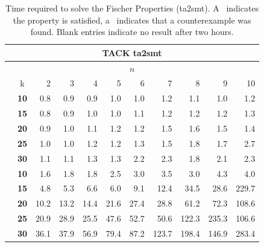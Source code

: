 \documentclass[a4paper,11pt]{report}
\newcommand*\cmark{\small\Checkmark}
\newcommand*{\xmark}{\small\XSolidBrush}
\theoremstyle{definition}
\begin{document}
\begin{table}
\begin{tabular}{c|c|r r r r r r r r r}
\end{tabular}
\end{table}



\begin{table}
\footnotesize
{}
\centering
\caption[Time required to solve the Fischer Properties (ta2smt)]{Time required to solve the Fischer Properties (ta2smt). A \cmark\
  indicates the property is satisfied, a \xmark\ indicates that a counterexample
  was found. Blank entries indicate no result after two hours.}
\label{table:fischer-results-ta2smt}
\begin{tabular}{c|c|r r r r r r r r r}
\midrule
\multicolumn{11}{c}{TACK ta2smt} \\
\midrule
\multicolumn{11}{c}{\(n\)} \\
\midrule
& k & 2 & 3 & 4 & 5 & 6 & 7 & 8 & 9 & 10 \\
\midrule
\multirow{5}{1em}{\rotatebox{90}{\textbf{live-one}}}
 & \textbf{10} & 0.8\cmark & 0.9\cmark & 0.9\cmark & 1.0\cmark & 1.0\cmark & 1.2\cmark & 1.1\cmark & 1.0\cmark & 1.2\cmark \\
 & \textbf{15} & 0.8\cmark & 0.9\cmark & 1.0\cmark & 1.0\cmark & 1.1\cmark & 1.2\cmark & 1.2\cmark & 1.2\cmark & 1.3\cmark \\
 & \textbf{20} & 0.9\cmark & 1.0\cmark & 1.1\cmark & 1.2\cmark & 1.2\cmark & 1.5\cmark & 1.6\cmark & 1.5\cmark & 1.4\cmark \\
 & \textbf{25} & 1.0\cmark & 1.0\cmark & 1.2\cmark & 1.2\cmark & 1.3\cmark & 1.5\cmark & 1.8\cmark & 1.7\cmark & 2.7\cmark \\
 & \textbf{30} & 1.1\cmark & 1.1\cmark & 1.3\cmark & 1.3\cmark & 2.2\cmark & 2.3\cmark & 1.8\cmark & 2.1\cmark & 2.3\cmark \\
  \midrule
\multirow{5}{1em}{\rotatebox{90}{\textbf{live-two}}}
  & \textbf{10} & 1.6\cmark & 1.8\cmark & 1.8\cmark & 2.5\cmark & 3.0\cmark & 3.5\cmark & 3.0\cmark & 4.3\cmark & 4.0\cmark \\
  & \textbf{15} & 4.8\cmark & 5.3\cmark & 6.6\cmark & 6.0\cmark & 9.1\cmark & 12.4\cmark & 34.5\cmark & 28.6\cmark & 229.7\cmark \\
  & \textbf{20} & 10.2\cmark & 13.2\cmark & 14.4\cmark & 21.6\cmark & 27.4\cmark & 28.8\cmark & 61.2\cmark & 72.3\cmark & 108.6\cmark \\
  & \textbf{25} & 20.9\cmark & 28.9\cmark & 25.5\cmark & 47.6\cmark & 52.7\cmark & 50.6\cmark & 122.3\cmark & 235.3\cmark & 106.6\cmark \\
  & \textbf{30} & 36.1\cmark & 37.9\cmark & 56.9\cmark & 79.4\cmark & 87.2\cmark & 123.7\cmark & 198.4\cmark & 146.9\cmark & 283.4\cmark \\
  \midrule


\end{tabular}
\end{table}
\end{document}
